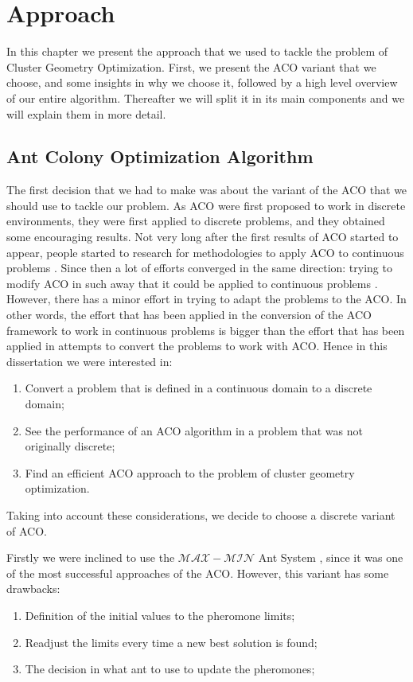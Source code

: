 \chapter{Approach}
\label{chap:approach}

In this chapter we present the approach that we used to tackle the problem of Cluster Geometry Optimization. First, we present the ACO variant that we choose, and some insights in why we choose it, followed by a high level overview of our entire algorithm. Thereafter we will split it in its main components and we will explain them in more detail.


	\section{Ant Colony Optimization Algorithm}
	The first decision that we had to make was about the variant of the ACO that we should use to tackle our problem. As ACO were first proposed to work in discrete environments, they were first applied to discrete problems, and they obtained some encouraging results. Not very long after the first results of ACO started to appear, people started to research for methodologies to apply ACO to continuous problems \cite{bilchev95}. Since then a lot of efforts converged in the same direction: trying to modify ACO in such away that it could be applied to continuous problems \cite{bilchev95, kong06, tsutsui04}. However, there has a minor effort in trying to adapt the problems to the ACO. In other words, the effort that has been applied in the conversion of the ACO framework to work in continuous problems is bigger than the effort that has been applied in attempts to convert the problems to work with ACO. Hence in this dissertation we were interested in:
	\begin{enumerate}
		\item Convert a problem that is defined in a continuous domain to a discrete domain;
		\item See the performance of an ACO algorithm in a problem that was not originally discrete;
		\item Find an efficient ACO approach to the problem of cluster geometry optimization.
	\end{enumerate}
	Taking into account these considerations, we decide to choose a discrete variant of ACO. 

	Firstly we were inclined to use the $\mathcal{MAX}-\mathcal{MIN}$ Ant System \cite{stutzle00}, since it was one of the most successful approaches of the ACO.  However, this variant has some drawbacks:
	\begin{enumerate}
		\item Definition of the initial values to the pheromone limits;
		\item Readjust the limits every time a new best solution is found; 
		\item The decision in what ant to use to update the pheromones;
	\end{enumerate}
	

